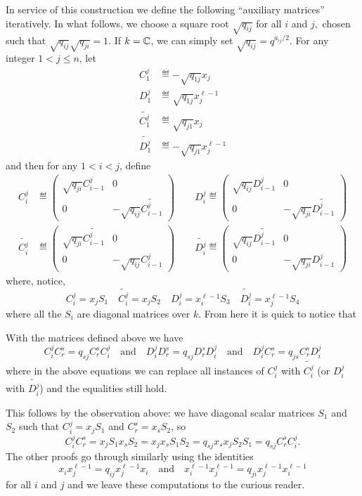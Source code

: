 \documentclass [11pt, proquest] {uwthesis}[2020/02/24]
\begin{document}
    In service of this construction we define the following ``auxiliary matrices'' iteratively. In what follows, we choose a square root $\sqrt{q_{ij}}$ for all $i$ and $j,$ chosen such that $\sqrt{q_{ij}}\sqrt{q_{ji}}=1.$ If $k=\mathbb{C}$, we can simply set $\sqrt{q_{ij}}=q^{a_{ij}/2}.$ For any integer $1< j\le n$, let
    \begin{align*}
        C_1^j&\eqdef -\sqrt{q_{1j}}x_j\\
        D_1^j&\eqdef \sqrt{q_{1j}}x_j^{\ell -1}\\
        \widetilde{C_1^j} &\eqdef \sqrt{q_{j1}}x_j\\
        \widetilde{D_1^j}&\eqdef -\sqrt{q_{j1}}x_j^{\ell -1}
    \end{align*}
    and then for any $1< i< j$, define
    \begin{align*}
        C_i^j&\eqdef\begin{pmatrix}\sqrt{q_{ji}}C_{i-1}^j & 0\\0 & -\sqrt{q_{ij}}\widetilde{C_{i-1}^j}\end{pmatrix}\qquad
        D_i^j\eqdef\begin{pmatrix}\sqrt{q_{ij}}D_{i-1}^j & 0\\0 & -\sqrt{q_{ji}}\widetilde{D_{i-1}^j}\end{pmatrix}\\
        \widetilde{C_i^j}&\eqdef\begin{pmatrix}\sqrt{q_{ji}}\widetilde{C_{i-1}^j} & 0\\0 & -\sqrt{q_{ij}}C_{i-1}^j\end{pmatrix}\qquad
        \widetilde{D_i^j}\eqdef\begin{pmatrix}\sqrt{q_{ij}}\widetilde{D_{i-1}^j} & 0\\0 & -\sqrt{q_{ji}}D_{i-1}^j\end{pmatrix}
    \end{align*}
    where, notice,
    \[C_i^j=x_jS_1\quad \widetilde{C_i^j}=x_jS_2\quad D_i^j=x_i^{\ell-1}S_3\quad \widetilde{D_i^j}=x_j^{\ell-1}S_4\]
    where all the $S_i$ are diagonal matrices over $k$. From here it is quick to notice that
    \begin{lem}\label{lem:C-D-commute}
        With the matrices defined above we have
        \[C_{i}^jC_r^s=q_{sj}C_r^sC_i^j\quad\text{and}\quad D_i^jD_r^s=q_{sj}D_r^sD_i^j\quad\text{and}\quad D_i^jC_r^s=q_{js}C_r^sD_i^j\]
        where in the above equations we can replace all instances of $C_i^j$ with $\widetilde{C_i^j}$ (or $D_i^j$ with $\widetilde{D_i^j}$) and the equalities still hold.
    \end{lem}
    \begin{prf}
        This follows by the observation above: we have diagonal scalar matrices $S_1$ and $S_2$ such that $C_i^j=x_jS_1$ and $C_r^s=x_sS_2$, so
        \[C_i^jC_r^s=x_jS_1x_sS_2=x_jx_sS_1S_2=q_{sj}x_sx_jS_2S_1=q_{sj}C_r^sC_i^j.\]
        The other proofs go through similarly using the identities
        \[x_ix_j^{\ell-1}=q_{ij}x_j^{\ell-1}x_i\quad\text{and}\quad x_i^{\ell-1}x_j^{\ell-1}=q_{ji}x_j^{\ell-1}x_i^{\ell-1}\]
        for all $i$ and $j$ and we leave these computations to the curious reader.
    \end{prf}
    
\end{document}

